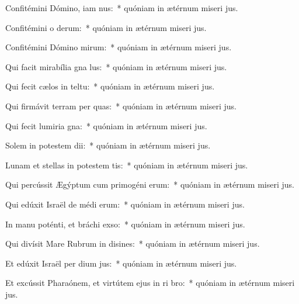 \item Confitémini Dómino, iam nus:~* quóniam in ætérnum miseri jus.
\item Confitémini o derum:~* quóniam in ætérnum miseri jus.
\item Confitémini Dómino mirum:~* quóniam in ætérnum miseri jus.
\item Qui facit mirabília gna lus:~* quóniam in ætérnum miseri jus.
\item Qui fecit cælos in teltu:~* quóniam in ætérnum miseri jus.
\item Qui firmávit terram per quas:~* quóniam in ætérnum miseri jus.
\item Qui fecit lumiria gna:~* quóniam in ætérnum miseri jus.
\item Solem in potestem dii:~* quóniam in ætérnum miseri jus.
\item Lunam et stellas in potestem tis:~* quóniam in ætérnum miseri jus.
\item Qui percússit Ægýptum cum primogéni erum:~* quóniam in ætérnum miseri jus.
\item Qui edúxit Israël de médi erum:~* quóniam in ætérnum miseri jus.
\item In manu poténti, et bráchi exso:~* quóniam in ætérnum miseri jus.
\item Qui divísit Mare Rubrum in disines:~* quóniam in ætérnum miseri jus.
\item Et edúxit Israël per dium jus:~* quóniam in ætérnum miseri jus.
\item Et excússit Pharaónem, et virtútem ejus in ri bro:~* quóniam in ætérnum miseri jus.
